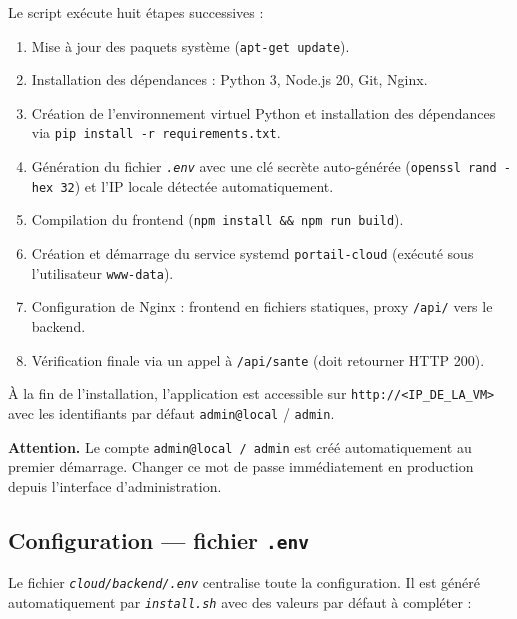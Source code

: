 \documentclass[a4paper]{article}
\newcommand{\cmd}[1]{\texttt{#1}}
\newcommand{\file}[1]{\texttt{\textit{#1}}}
\begin{document}
Le script exécute huit étapes successives :

\begin{enumerate}
  \item Mise à jour des paquets système (\cmd{apt-get update}).
  \item Installation des dépendances : Python 3, Node.js 20, Git, Nginx.
  \item Création de l'environnement virtuel Python et installation des dépendances via \cmd{pip install -r requirements.txt}.
  \item Génération du fichier \file{.env} avec une clé secrète auto-générée (\cmd{openssl rand -hex 32}) et l'IP locale détectée automatiquement.
  \item Compilation du frontend (\cmd{npm install \&\& npm run build}).
  \item Création et démarrage du service systemd \cmd{portail-cloud} (exécuté sous l'utilisateur \cmd{www-data}).
  \item Configuration de Nginx : frontend en fichiers statiques, proxy \cmd{/api/} vers le backend.
  \item Vérification finale via un appel à \cmd{/api/sante} (doit retourner HTTP 200).
\end{enumerate}

À la fin de l'installation, l'application est accessible sur \cmd{http://<IP\_DE\_LA\_VM>} avec les identifiants par défaut \cmd{admin@local} / \cmd{admin}.

\begin{warnbox}
  \textbf{Attention.} Le compte \cmd{admin@local / admin} est créé automatiquement au premier démarrage. Changer ce mot de passe immédiatement en production depuis l'interface d'administration.
\end{warnbox}

\subsection{Configuration --- fichier \texttt{.env}}

Le fichier \file{cloud/backend/.env} centralise toute la configuration. Il est généré automatiquement par \file{install.sh} avec des valeurs par défaut à compléter :
\end{document}
